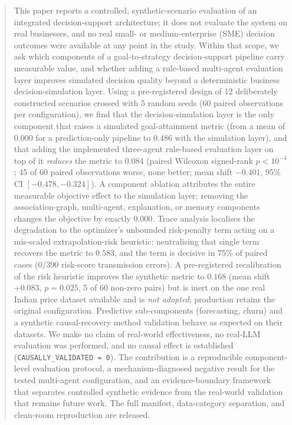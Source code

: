 \documentclass[conference]{IEEEtran}
\newcommand{\code}[1]{\texttt{#1}}
\begin{document}
\begin{abstract}
This paper reports a controlled, synthetic-scenario evaluation of an integrated
decision-support architecture; it does not evaluate the system on real
businesses, and no real small- or medium-enterprise (SME) decision outcomes were
available at any point in the study. Within that scope, we ask which components
of a goal-to-strategy decision-support pipeline carry measurable value, and
whether adding a rule-based multi-agent evaluation layer improves simulated
decision quality beyond a deterministic business decision-simulation layer.
Using a pre-registered design of 12 deliberately constructed scenarios crossed
with 5 random seeds (60 paired observations per configuration), we find that the
decision-simulation layer is the only component that raises a simulated
goal-attainment metric (from a mean of $0.000$ for a prediction-only pipeline to
$0.486$ with the simulation layer), and that adding the implemented three-agent
rule-based evaluation layer on top of it \emph{reduces} the metric to $0.084$
(paired Wilcoxon signed-rank $p<10^{-4}$; 45 of 60 paired observations worse,
none better; mean shift $-0.401$, 95\% CI $[-0.478,-0.324]$). A component
ablation attributes the entire measurable objective effect to the simulation
layer; removing the association-graph, multi-agent, explanation, or memory
components changes the objective by exactly $0.000$. Trace analysis localises
the degradation to the optimizer's unbounded risk-penalty term acting on a
mis-scaled extrapolation-risk heuristic: neutralising that single term recovers
the metric to $0.583$, and the term is decisive in 75\% of paired cases
($0/390$ risk-score transmission errors). A pre-registered recalibration of the
risk heuristic improves the synthetic metric to $0.168$ (mean shift $+0.083$,
$p=0.025$, 5 of 60 non-zero pairs) but is inert on the one real Indian price
dataset available and is \emph{not adopted}; production retains the original
configuration. Predictive sub-components (forecasting, churn) and a synthetic
causal-recovery method validation behave as expected on their datasets. We make
no claim of real-world effectiveness, no real-LLM evaluation was performed, and
no causal effect is established (\code{CAUSALLY\_VALIDATED = 0}). The
contribution is a reproducible component-level evaluation protocol, a
mechanism-diagnosed negative result for the tested multi-agent configuration,
and an evidence-boundary framework that separates controlled synthetic evidence
from the real-world validation that remains future work. The full manifest,
data-category separation, and clean-room reproduction are released.
\end{abstract}
\end{document}
